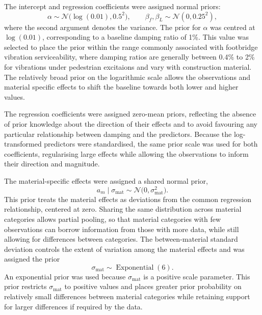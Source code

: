 \documentclass[preprint,a4paper,12pt]{elsarticle}
\begin{document}
The intercept and regression coefficients were assigned normal priors:
\begin{equation}
    \alpha \sim \mathcal{N}\bigl(\log(0.01),0.5^2\bigr),
    \qquad
    \beta_f,\beta_L \sim \mathcal{N}(0,0.25^2),
\end{equation}
where the second argument denotes the variance.
The prior for $\alpha$ was centred at $\log(0.01)$, corresponding to a baseline damping ratio of 1\%. 
This value was selected to place the prior within the range commonly associated with footbridge vibration serviceability, where damping ratios are generally between 0.4\% to 2\% \cite{EN1991_2_2023,setra2006,feldman2008hivoss} for vibrations under pedestrian excitaions and vary with construction material.
The relatively broad prior on the logarithmic scale allows the observations and material specific effects to shift the baseline towards both lower and higher values.

The regression coefficients were assigned zero-mean priors, reflecting the absence of prior knowledge about the direction of their effects and to avoid favouring any particular relationship between damping and the predictors.
Because the log-transformed predictors were standardised, the same prior scale was used for both coefficients, regularising large effects while allowing the observations to inform their direction and magnitude.

The material-specific effects were assigned a shared normal prior,
\begin{equation}
    a_m \mid \sigma_{\mathrm{mat}}
    \sim
    \mathcal{N}\bigl(0,\sigma_{\mathrm{mat}}^2\bigr).
\end{equation}
This prior treats the material effects as deviations from the common regression relationship, centered at zero.
Sharing the same distribution across material categories allows partial pooling, so that material categories with few observations can borrow information from those with more data, while still allowing for differences between categories.
The between-material standard deviation controls the extent of variation among the material effects and was assigned the prior
\begin{equation}
    \sigma_{\mathrm{mat}}
    \sim
    \operatorname{Exponential}(6).
\end{equation}
An exponential prior was used because $\sigma_{\mathrm{mat}}$ is a
positive scale parameter.
This prior restricts $\sigma_{\mathrm{mat}}$ to positive values and places greater prior probability on relatively small differences between material categories while retaining support for larger differences if required by the data.
\end{document}
